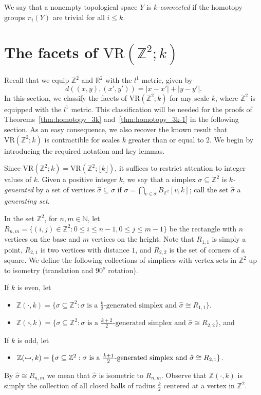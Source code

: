 \documentclass[12pt,a4paper]{amsart}
\newcommand\edge{\mathrel{\boldsymbol{\cdot}\mkern-4mu{-}\mkern-4mu\boldsymbol{\cdot}}}
\theoremstyle{definition}
\newcommand{\N}{\ensuremath{\mathbb{N}}}
\newcommand{\R}{\ensuremath{\mathbb{R}}}
\newcommand{\Z}{\ensuremath{\mathbb{Z}}}
\newcommand{\vr}[2]{\mathrm{VR}(#1;#2)}
\numberwithin{equation}{section}
\begin{document}
We say that a nonempty topological space $Y$ is \emph{$k$-connected} if the homotopy groups $\pi_i(Y)$ are trivial for all $i\le k$.



\section{The facets of $\vr{\Z^2}{k}$}
\label{sec:Z^2}

Recall that we equip $\Z^2$ and $\R^2$ with the $l^1$ metric, given by
\[d((x,y),(x',y'))=|x-x'|+|y-y'|.\]
In this section, we classify the facets of $\vr{\Z^2}{k}$ for any scale $k$, where $\Z^2$ is equipped with the $l^1$ metric.
This classification will be needed for the proofs of Theorems~\ref{thm:homotopy_3k} and~\ref{thm:homotopy_3k-1} in the following section.
As an easy consequence, we also recover the known result that $\vr{\Z^2}{k}$ is contractible for scales $k$ greater than or equal to $2$.
We begin by introducing the required notation and key lemmas.

Since $\vr{\Z^2}{k}=\vr{\Z^2}{\lfloor k\rfloor}$, it suffices to restrict attention to integer values of $k$.
Given a positive integer $k$, we say that a simplex $\sigma \subseteq \Z^2$ is \emph{$k$-generated} by a set of vertices $\hat \sigma \subseteq \sigma$ if $\sigma = \bigcap_{v\in \hat \sigma} B_{\Z^2}[v,k]$; call the set $\hat \sigma$ a \emph{generating set}.

In the set $\Z^2$, for $n, m \in \N$, let $R_{n,m} = \{ (i,j) \in \Z^2 : 0 \le i\le n-1, 0\le j\le m-1\}$ be the rectangle with $n$ vertices on the base and $m$ vertices on the height.
Note that $R_{1,1}$ is simply a point, $R_{2,1}$ is two vertices with distance $1$, and $R_{2,2}$ is the set of corners of a square.
We define the following collections of simplices with vertex sets in $\Z^2$ up to isometry (translation and $90^o$ rotation).

If $k$ is even, let 
\begin{itemize}
\item
$\Z ( \boldsymbol{\cdot} , k) = \{ \sigma \subseteq \Z^2 : \sigma \text{ is a $\frac{k}{2}$-generated simplex and } \hat \sigma \cong R_{1,1} \}$.
\item
$\Z (\square, k) = \{ \sigma \subseteq \Z^2 : \sigma \text{ is a $\frac{k+2}{2}$-generated simplex and } \hat \sigma \cong R_{2,2} \}$, and
\end{itemize}
If $k$ is odd, let 
\begin{itemize}
\item
$\Z ( \edge, k) = \{ \sigma \subseteq \Z^2 : \sigma \text{ is a $\frac{k+1}{2}$-generated simplex and } \hat \sigma \cong R_{2,1} \}$.
\end{itemize}
By $\hat \sigma \cong R_{n,m}$ we mean that $\hat \sigma$ is isometric to $R_{n,m}$.
Observe that $\Z ( \boldsymbol{\cdot} , k)$ is simply the collection of all closed balls of radius $\frac{k}{2}$ centered at a vertex in $\Z^2$.
\end{document}
